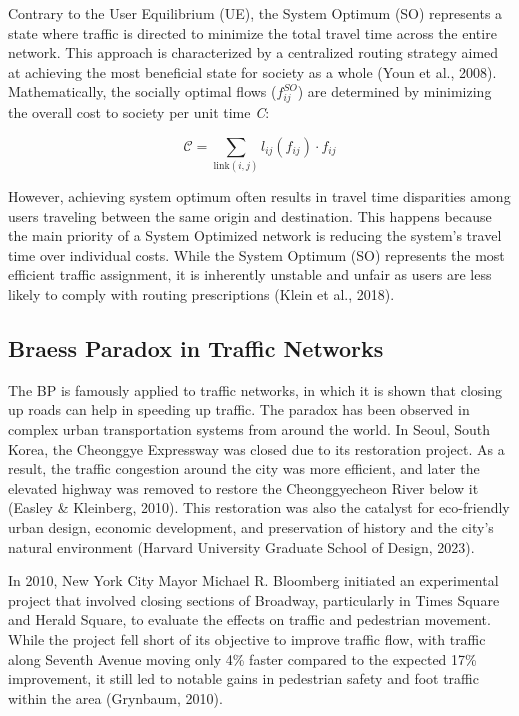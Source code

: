 Contrary to the User Equilibrium (UE), the System Optimum (SO) represents a state where traffic is directed to minimize the total travel time across the entire network. This approach is characterized by a centralized routing strategy aimed at achieving the most beneficial state for society as a whole (Youn et al., 2008). Mathematically, the socially optimal flows ($f_{ij}^{SO}$) are determined by minimizing the overall cost to society per unit time \textit{C}:

\begin{equation}
    \mathcal{C} = \sum_{\text{link}(i,j)} l_{ij}(f_{ij}) \cdot f_{ij}
    \label{eq:system_optimum}
\end{equation}

However, achieving system optimum often results in travel time disparities among users traveling between the same origin and destination. This happens because the main priority of a System Optimized network is reducing the system's travel time over individual costs. While the System Optimum (SO) represents the most efficient traffic assignment, it is inherently unstable and unfair as users are less likely to comply with routing prescriptions (Klein et al., 2018).

\subsection{Braess Paradox in Traffic Networks}
\label{chap:bp_traffic_networks}

The BP is famously applied to traffic networks, in which it is shown that closing up roads can help in speeding up traffic. The paradox has been observed in complex urban transportation systems from around the world. In Seoul, South Korea, the Cheonggye Expressway was closed due to its restoration project. As a result, the traffic congestion around the city was more efficient, and later the elevated highway was removed to restore the Cheonggyecheon River below it (Easley \& Kleinberg, 2010). This restoration was also the catalyst for eco-friendly urban design, economic development, and preservation of history and the city's natural environment (Harvard University Graduate School of Design, 2023).

In 2010, New York City Mayor Michael R. Bloomberg initiated an experimental project that involved closing sections of Broadway, particularly in Times Square and Herald Square, to evaluate the effects on traffic and pedestrian movement. While the project fell short of its objective to improve traffic flow, with traffic along Seventh Avenue moving only 4\% faster compared to the expected 17\% improvement, it still led to notable gains in pedestrian safety and foot traffic within the area (Grynbaum, 2010). 

